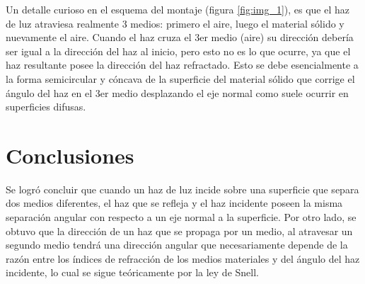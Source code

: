 \documentclass[
aps,
reprint,
amsmath, amssymb,
superscriptaddress,
]{revtex4-2}
\begin{document}
Un detalle curioso en el esquema del montaje (figura \ref{fig:img_1}), es que el haz de luz atraviesa realmente 3 medios: primero el aire, luego el material sólido y nuevamente el aire. Cuando el haz cruza el 3er medio (aire) su dirección debería ser igual a la dirección del haz al inicio, pero esto no es lo que ocurre, ya que el haz resultante posee la dirección del haz refractado. Esto se debe esencialmente a la forma semicircular y cóncava de la superficie del material sólido que corrige el ángulo del haz en el 3er medio desplazando el eje normal como suele ocurrir en superficies difusas.
\section{Conclusiones}
Se logró concluir que cuando un haz de luz incide sobre una superficie que separa dos medios diferentes, el haz que se refleja y el haz incidente poseen la misma separación angular con respecto a un eje normal a la superficie. Por otro lado, se obtuvo que la dirección de un haz que se propaga por un medio, al atravesar un segundo medio tendrá una dirección angular que necesariamente depende de la razón entre los índices de refracción de los medios materiales y del ángulo del haz incidente, lo cual se sigue teóricamente por la ley de Snell.




\end{document}

